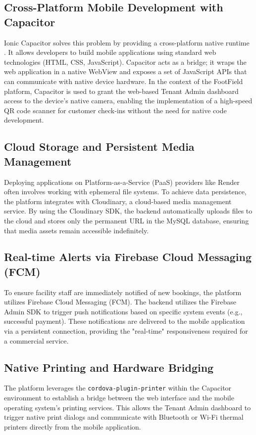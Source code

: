 \subsection{Cross-Platform Mobile Development with Capacitor}
Ionic Capacitor solves this problem by providing a cross-platform native runtime \cite{capacitor}. It allows developers to build mobile applications using standard web technologies (HTML, CSS, JavaScript). Capacitor acts as a bridge; it wraps the web application in a native WebView and exposes a set of JavaScript APIs that can communicate with native device hardware. In the context of the FootField platform, Capacitor is used to grant the web-based Tenant Admin dashboard access to the device's native camera, enabling the implementation of a high-speed QR code scanner for customer check-ins without the need for native code development.

\subsection{Cloud Storage and Persistent Media Management}
Deploying applications on Platform-as-a-Service (PaaS) providers like Render often involves working with ephemeral file systems. To achieve data persistence, the platform integrates with Cloudinary, a cloud-based media management service. By using the Cloudinary SDK, the backend automatically uploads files to the cloud and stores only the permanent URL in the MySQL database, ensuring that media assets remain accessible indefinitely.

\subsection{Real-time Alerts via Firebase Cloud Messaging (FCM)}
To ensure facility staff are immediately notified of new bookings, the platform utilizes Firebase Cloud Messaging (FCM). The backend utilizes the Firebase Admin SDK to trigger push notifications based on specific system events (e.g., successful payment). These notifications are delivered to the mobile application via a persistent connection, providing the "real-time" responsiveness required for a commercial service.

\subsection{Native Printing and Hardware Bridging}
The platform leverages the \texttt{cordova-plugin-printer} within the Capacitor environment to establish a bridge between the web interface and the mobile operating system's printing services. This allows the Tenant Admin dashboard to trigger native print dialogs and communicate with Bluetooth or Wi-Fi thermal printers directly from the mobile application.